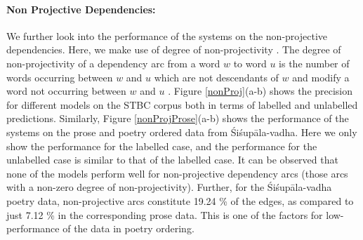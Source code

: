 \documentclass[11pt]{article}
\begin{document}
\paragraph{Non Projective Dependencies:} We further look into the performance of the systems on the non-projective dependencies. Here, we make use of degree of non-projectivity  \cite{mcdonald-nivre-2007-characterizing}. The degree of non-projectivity of a dependency arc from a word $w$ to word $u$ is the number of words occurring between $w$ and $u$ which are not descendants of $w$ and modify a word not occurring between $w$ and $u$ \cite{nivre-2006-constraints}. Figure \ref{nonProj}(a-b) shows the precision for different models on the STBC corpus both in terms of labelled and unlabelled predictions. Similarly, Figure \ref{nonProjProse}(a-b) shows the performance of the systems on the prose and poetry ordered data from Śiśupāla-vadha. Here we only show the performance for the labelled case, and the performance for the unlabelled case is similar to that of the labelled case.  It can be observed that none of the models perform well for non-projective dependency arcs (those arcs with a non-zero degree of non-projectivity). Further, for the Śiśupāla-vadha poetry data, non-projective arcs constitute 19.24 \% of the edges, as compared to just 7.12 \% in the corresponding prose data. This is one of the factors for low-performance of the data in poetry ordering. 

\end{document}

